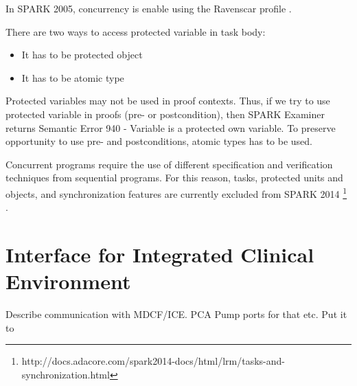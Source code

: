 In SPARK 2005, concurrency is enable using the Ravenscar profile \cite{Ravenscar:Online}. 

There are two ways to access protected variable in task body:
\begin{itemize}
    \item It has to be protected object
    \item It has to be atomic type
\end{itemize}

Protected variables may not be used in proof contexts. Thus, if we try to use protected variable in proofs (pre- or postcondition), then SPARK Examiner returns Semantic Error 940 - Variable is a protected own variable. To preserve opportunity to use pre- and postconditions, atomic types has to be used.


Concurrent programs require the use of different specification and verification techniques from sequential programs. For this reason, tasks, protected units and objects, and synchronization features are currently excluded from SPARK 2014 \footnote{http://docs.adacore.com/spark2014-docs/html/lrm/tasks-and-synchronization.html} \cite{Spark2014refManual:Online}.

\cite{Ravenscar:Article}

\section{Interface for Integrated Clinical Environment}
\label{pcapump:implementation:ice}

Describe communication with MDCF/ICE. PCA Pump ports for that etc.
Put it to 
